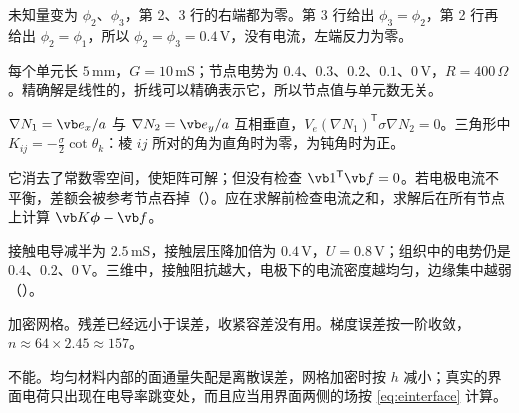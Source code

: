 \begin{answers}
\item 未知量变为 $\phi_2$、$\phi_3$，第 2、3 行的右端都为零。第 3 行给出 $\phi_3=\phi_2$，第 2 行再给出 $\phi_2=\phi_1$，所以 $\phi_2=\phi_3=0.4\,\mathrm V$，没有电流，左端反力为零。
\item 每个单元长 $5\,\mathrm{mm}$，$G=10\,\mathrm{mS}$；节点电势为 $0.4$、$0.3$、$0.2$、$0.1$、$0\,\mathrm V$，$R=400\,\Omega$。精确解是线性的，折线可以精确表示它，所以节点值与单元数无关。
\item $\nabla N_1=\vb e_x/a$ 与 $\nabla N_2=\vb e_y/a$ 互相垂直，$V_e(\nabla N_1)^{\mathsf T}\sigma\nabla N_2=0$。三角形中 $K_{ij}=-\tfrac\sigma2\cot\theta_k$：棱 $ij$ 所对的角为直角时为零，为钝角时为正。
\item 它消去了常数零空间，使矩阵可解；但没有检查 $\vb 1^{\mathsf T}\vb f=0$。若电极电流不平衡，差额会被参考节点吞掉（）。应在求解前检查电流之和，求解后在所有节点上计算 $\vb K\boldsymbol\phi-\vb f$。
\item 接触电导减半为 $2.5\,\mathrm{mS}$，接触层压降加倍为 $0.4\,\mathrm V$，$U=0.8\,\mathrm V$；组织中的电势仍是 $0.4$、$0.2$、$0\,\mathrm V$。三维中，接触阻抗越大，电极下的电流密度越均匀，边缘集中越弱（）。
\item 加密网格。残差已经远小于误差，收紧容差没有用。梯度误差按一阶收敛，$n\approx64\times2.45\approx157$。
\item 不能。均匀材料内部的面通量失配是离散误差，网格加密时按 $h$ 减小；真实的界面电荷只出现在电导率跳变处，而且应当用界面两侧的场按 \eqref{eq:einterface} 计算。
\end{answers}
